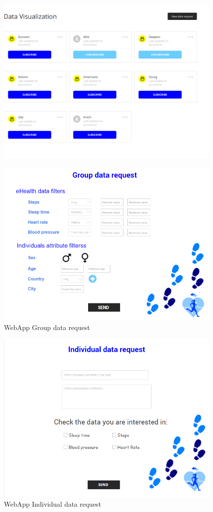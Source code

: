 \begin{figure}[H]
\centering
  \includegraphics[width=0.79\linewidth]{resources/Screen/DataVisualization.png}
  \label{fig:WebApp data visualization}
\end{figure}


\begin{figure}[H]
\centering
  \includegraphics[width=0.79\linewidth]{resources/Screen/Groupdatarequest.png}
  \caption{WebApp Group data request}
  \label{fig:WebApp GroupData Request}
\end{figure}


\begin{figure}[H]
\centering
  \includegraphics[width=0.79\linewidth]{resources/Screen/individualdatarequest.png}
  \caption{WebApp Individual data request}
  \label{fig:WebApp Individual data request}
\end{figure}


